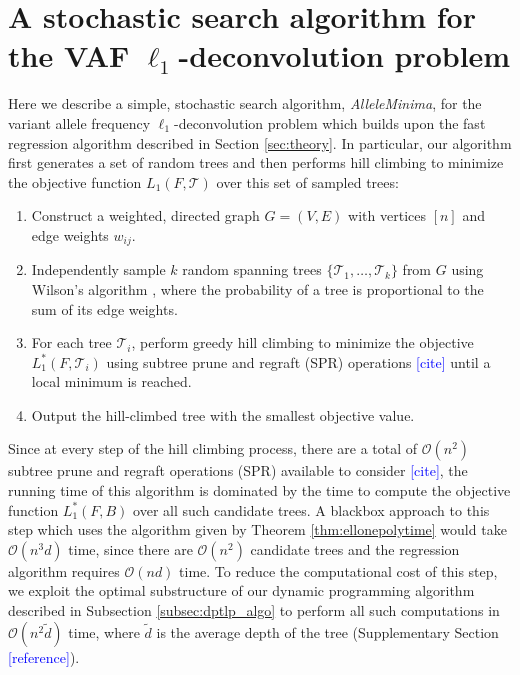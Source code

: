 \documentclass[10pt]{article}
\newcommand{\ourmethod}{\textit{AlleleMinima}\xspace}
\newcommand{\henri}[1]{\textcolor{blue}{[#1]}}
\newcommand{\tree}{\mathcal{T}}
\begin{document}
\section{A stochastic search algorithm for the VAF $\ell_1$-deconvolution problem}
\label{sec:ell1_deconvolution}
Here we describe a simple, stochastic search algorithm, \ourmethod, for the 
variant allele frequency $\ell_1$-deconvolution problem which builds 
upon the fast regression algorithm described in Section \ref{sec:theory}. In particular,
our algorithm first generates a set of random trees and then performs hill climbing to 
minimize the objective function $L_1(F, \tree)$ over this set of sampled trees:
\begin{enumerate}
    \item Construct a weighted, directed graph $G = (V, E)$ with vertices $[n]$ and edge weights $w_{ij}$.
    \item Independently sample $k$ random spanning trees $\{\tree_1, \ldots, \tree_k\}$ from $G$ using Wilson's algorithm \cite{wilson1996generating},
        where the probability of a tree is proportional to the sum of its edge weights.
    \item For each tree $\tree_i$, perform greedy hill climbing to minimize the objective $L_1^*(F, \tree_i)$ using
        subtree prune and regraft (SPR) operations \henri{cite} until a local minimum is reached. 
    \item Output the hill-climbed tree with the smallest objective value.
\end{enumerate}
Since at every step of the hill climbing process, there are a total of $\mathcal{O}(n^2)$ subtree prune and regraft operations (SPR) available to consider 
\henri{cite}, the running time of this algorithm is dominated by the time to compute the objective function $L_1^*(F, B)$ over
all such candidate trees. A blackbox approach to this step which uses the algorithm given by Theorem \ref{thm:ellonepolytime} would 
take $\mathcal{O}(n^3d)$ time, since there are $\mathcal{O}(n^2)$ candidate trees and the regression algorithm requires $\mathcal{O}(nd)$ 
time. To reduce the computational cost of this step, we exploit the optimal substructure of
our dynamic programming algorithm described in Subsection \ref{subsec:dptlp_algo} to perform all such 
computations in $\mathcal{O}(n^2\tilde{d})$ time, where $\tilde{d}$ is the average depth of the tree 
(Supplementary Section \henri{reference}).
\end{document}
